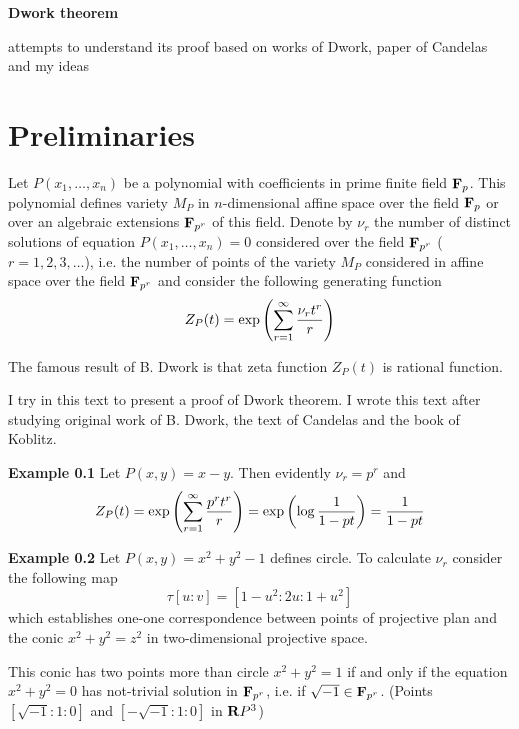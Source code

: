 \documentclass[12pt]{article}
\theoremstyle{theorem}
\numberwithin{equation}{section}
\begin{document}
  \centerline {\bf Dwork theorem}

  \centerline {attempts to understand its proof based on works of Dwork, paper of Candelas and my ideas }



\tableofcontents

\section*{Preliminaries}

Let $P(x_1,\dots,x_n)$ be a polynomial with coefficients in prime
finite field ${\bf F}_p$. This polynomial defines variety $M_P$ in
$n$-dimensional affine space over the field ${\bf F}_p$ or over an algebraic
extensions ${\bf F}_{p^r}$ of this field. Denote by $\nu_r$ the number of distinct
solutions of equation $P(x_1,\dots,x_n)=0$ considered over the field ${\bf F}_{p^r}$
($r=1,2,3,\dots $), i.e. the number of points of the variety  $M_P$ considered
in affine space over the field ${\bf F}_{p^r}$ and consider the following generating
function
          \begin{equation}\label{zetafunctionasgenfunctionofsolut}
        Z_P(t)=\exp\left(\sum_{r=1}^\infty {\nu_rt^r\over r}\right)
          \end{equation}

The famous result of B. Dwork is that zeta function $Z_P(t)$ is rational function.

I try in this text to present a proof of Dwork theorem.
I wrote this text after studying original work of B. Dwork, the text of Candelas
and the book of Koblitz.




\medskip

{\bf Example 0.1} Let $P(x,y)=x-y$. Then evidently $\nu_r=p^r$ and
\begin{equation}\label{trivialxampleofzetafunction}
         Z_P(t)=\exp\left(\sum_{r=1}^\infty {p^rt^r\over r}\right)=
          \exp\left(\log{1\over 1-pt}\right)={1\over 1-pt}
          \end{equation}

{\bf Example 0.2} Let $P(x,y)=x^2+y^2-1$ defines circle.
   To calculate $\nu_r$ consider the  following map
            $$
         \tau[u:v]=[1-u^2: 2u: 1+u^2]
            $$
which establishes one-one correspondence between
points of  projective plan and the conic $x^2+y^2=z^2$ in two-dimensional projective space.

This conic has two points more than circle $x^2+y^2=1$ if and only if the equation
$x^2+y^2=0$ has not-trivial solution in ${\bf F}_{p^r}$, i.e. if $\sqrt {-1}\in {\bf F}_{p^r}$.
(Points $[\sqrt{-1}:1:0]$ and $[-\sqrt{-1}:1:0]$ in ${\bf R} P^3$)
\end{document}
